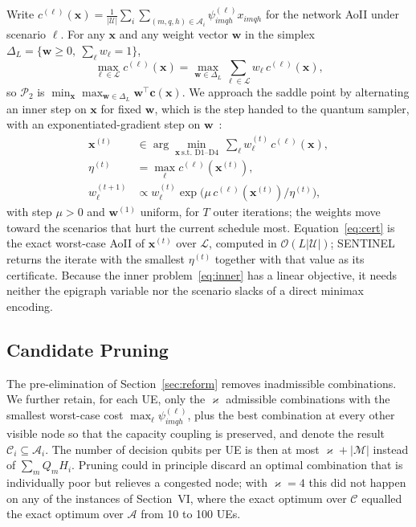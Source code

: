 Write $c^{(\ell)}(\mathbf{x})=\frac{1}{|\mathscr{U}|}\sum_{i}\sum_{(m,q,h)\in\mathscr{A}_i}\psi^{(\ell)}_{imqh}x_{imqh}$
for the network AoII under scenario $\ell$. For any $\mathbf{x}$ and any weight vector $\mathbf{w}$ in the simplex
$\Delta_L=\{\mathbf{w}\geq 0,\ \sum_\ell w_\ell=1\}$,
\begin{equation}
    \max_{\ell\in\mathscr{L}} c^{(\ell)}(\mathbf{x})
    =\max_{\mathbf{w}\in\Delta_L}\sum_{\ell\in\mathscr{L}} w_\ell\, c^{(\ell)}(\mathbf{x}),
    \label{eq:dual_max}
\end{equation}
so $\mathscr{P}_{2}$ is $\min_{\mathbf{x}}\max_{\mathbf{w}\in\Delta_L}\mathbf{w}^{\top}\mathbf{c}(\mathbf{x})$. We
approach the saddle point by alternating an inner step on $\mathbf{x}$ for fixed $\mathbf{w}$, which is the step
handed to the quantum sampler, with an exponentiated-gradient step on $\mathbf{w}$~\cite{Arora2012}:
\begin{align}
    \mathbf{x}^{(t)} &\in \arg\min_{\mathbf{x}\ \text{s.t. D1--D4}}\ \sum_{\ell} w^{(t)}_\ell\, c^{(\ell)}(\mathbf{x}),
    \label{eq:inner}\\
    \eta^{(t)} &= \max_{\ell} c^{(\ell)}(\mathbf{x}^{(t)}),
    \label{eq:cert}\\
    w^{(t+1)}_\ell &\propto w^{(t)}_\ell \exp\!\bigl(\mu\, c^{(\ell)}(\mathbf{x}^{(t)})/\eta^{(t)}\bigr),
    \label{eq:eg}
\end{align}
with step $\mu>0$ and $\mathbf{w}^{(1)}$ uniform, for $T$ outer iterations; the weights move toward the scenarios
that hurt the current schedule most. Equation~\eqref{eq:cert} is the exact worst-case AoII of $\mathbf{x}^{(t)}$ over $\mathscr{L}$, computed in
$\mathcal{O}(L|\mathscr{U}|)$; SENTINEL returns the iterate with the smallest $\eta^{(t)}$ together with that value as
its certificate. Because the inner problem~\eqref{eq:inner} has a linear objective, it needs neither the epigraph
variable nor the scenario slacks of a direct minimax encoding.

\subsection{Candidate Pruning}
\label{sec:pruning}

The pre-elimination of Section~\ref{sec:reform} removes inadmissible combinations. We further retain, for each UE, only the
$\varkappa$ admissible combinations with the smallest worst-case cost $\max_\ell\psi^{(\ell)}_{imqh}$, plus the best
combination at every other visible node so that the capacity coupling is preserved, and denote the result
$\mathscr{C}_i\subseteq\mathscr{A}_i$. The number of decision qubits per UE is then at most $\varkappa+|\mathscr{M}|$
instead of $\sum_m Q_mH_i$. Pruning could in principle discard an optimal combination that is individually poor but
relieves a congested node; with $\varkappa=4$ this did not happen on any of the instances of Section~VI, where the
exact optimum over $\mathscr{C}$ equalled the exact optimum over $\mathscr{A}$ from 10 to 100 UEs.

